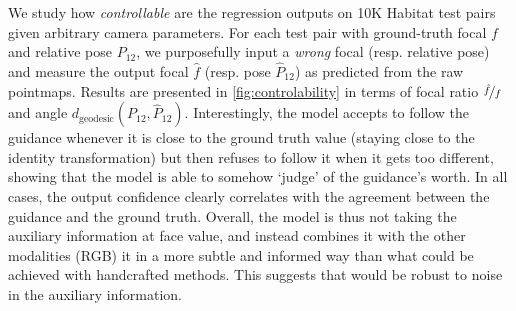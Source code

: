 \begin{table}[]
    \centering
     \vspace{-0.3cm}
    \caption{\textbf{Multi-view depth estimation results in high-resolution}
        using a sliding-window scheme and providing the crop intrinsics to \ours{}. 
        (n): naively inputting high-resolution images without downsampling to \ours{}.
        }
    \vspace{-0.4cm}
    \label{tab:native}
\end{table}



We study how \emph{controllable} are the regression outputs on 10K Habitat test pairs given arbitrary camera parameters.
For each test pair with ground-truth focal $f$ and relative pose $P_{12}$, we purposefully input a \emph{wrong} focal (resp. relative pose) and measure the output focal $\hat{f}$ (resp. pose $\hat{P}_{12}$) as predicted from the raw pointmaps.
Results are presented in \cref{fig:controlability} in terms of focal ratio $\nicefrac{\hat{f}}{f}$ and angle $d_{\text{geodesic}}(P_{12}, \hat{P}_{12})$.
Interestingly, the model accepts to follow the guidance whenever it is close to the ground truth value (\ie staying close to the identity transformation) %
but then refuses to follow it when it gets too different, showing that the model is able to somehow `judge' of the guidance's worth.
In all cases, the output confidence clearly correlates with the agreement between the guidance and the ground truth.
Overall, the model is thus not taking the auxiliary information at face value, and instead combines it with the other modalities (\eg RGB) it in a more subtle and informed way than what could be achieved with handcrafted methods.
This suggests that \ours{} would be robust to noise in the auxiliary information.

